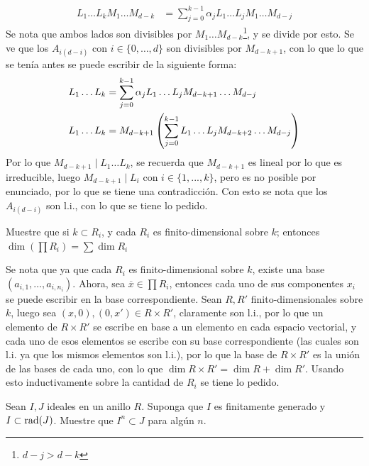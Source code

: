\begin{sol}{2.35}
\begin{enumerate}
\begin{align*}
            L_1\dots L_kM_1\dots M_{d-k} & = \sum_{j=0}^{k-1}\alpha_jL_1\dots L_jM_1\dots M_{d-j}
        \end{align*}
        Se nota que ambos lados son divisibles por \(M_1\dots M_{d-k}\)\footnote{\(d-j>d-k\)}, y se divide por esto. Se ve que los \(A_{i(d-i)}\) con \(i\in\{0,\dots ,d\}\) son divisibles por \(M_{d-k+1}\), con lo que lo que se tenía antes se puede escribir de la siguiente forma:
        \begin{align*}
            L_1\dots L_k &= \sum_{j=0}^{k-1}\alpha_jL_1\dots L_jM_{d-k+1}\dots M_{d-j}\\
            L_1\dots L_k &= M_{d-k+1}\left(\sum_{j=0}^{k-1}L_1\dots L_jM_{d-k+2}\dots M_{d-j}\right)
        \end{align*}
        Por lo que \(M_{d-k+1}\mid L_1\dots L_k\), se recuerda que \(M_{d-k+1}\) es lineal por lo que es irreducible, luego \(M_{d-k+1}\mid L_i\) con \(i\in\{1,...,k\}\), pero es no posible por enunciado, por lo que se tiene una contradicción. Con esto se nota que los \(A_{i(d-i)}\) son l.i., con lo que se tiene lo pedido.
    \end{enumerate}
\end{sol}

\begin{prob}{2.38}
    Muestre que si \(k\subset R_i\), y cada \(R_i\) es finito-dimensional sobre \(k\); entonces \(\dim(\prod R_i)=\sum\dim R_i\)
\end{prob}

\begin{sol}{2.38}
    Se nota que ya que cada \(R_i\) es finito-dimensional sobre \(k\), existe una base \((a_{i,1},\dots ,a_{i,n_i})\). Ahora, sea \(\overline{x}\in\prod R_i\), entonces cada uno de sus componentes \(x_i\) se puede escribir en la base correspondiente. Sean \(R,R'\) finito-dimensionales sobre \(k\), luego sea \((x,0),(0,x')\in R\times R'\), claramente son l.i., por lo que un elemento de \(R\times R'\) se escribe en base a un elemento en cada espacio vectorial, y cada uno de esos elementos se escribe con su base correspondiente (las cuales son l.i. ya que los mismos elementos son l.i.), por lo que la base de \(R\times R'\) es la unión de las bases de cada uno, con lo que \(\dim R\times R'=\dim R+\dim R'\). Usando esto inductivamente sobre la cantidad de \(R_i\) se tiene lo pedido.
\end{sol}

\begin{prob}{2.41}
    Sean \(I,J\) ideales en un anillo \(R\). Suponga que \(I\) es finitamente generado y \(I\subset\operatorname{rad}(J)\). Muestre que \(I^n\subset J\) para algún \(n\).
\end{prob}

